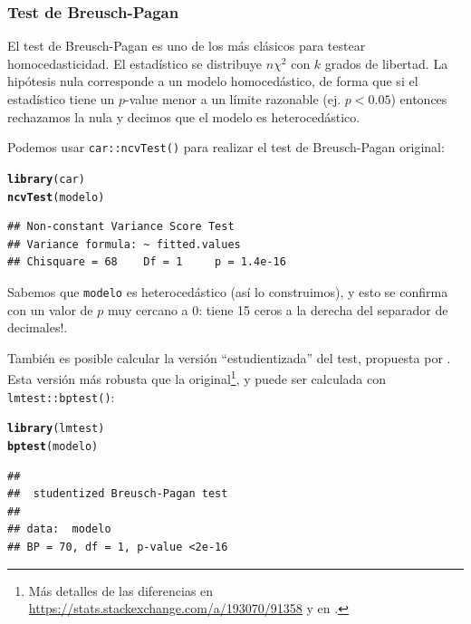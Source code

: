 \documentclass{article}\usepackage[]{graphicx}\usepackage[]{color}
\makeatletter
\newcommand{\hlstd}[1]{\textcolor[rgb]{0.345,0.345,0.345}{#1}}%
\newcommand{\hlkwd}[1]{\textcolor[rgb]{0.737,0.353,0.396}{\textbf{#1}}}%
\newenvironment{kframe}{%
 \def\at@end@of@kframe{}%
 \ifinner\ifhmode%
  \def\at@end@of@kframe{\end{minipage}}%
  \begin{minipage}{\columnwidth}%
 \fi\fi%
 \def\FrameCommand##1{\hskip\@totalleftmargin \hskip-\fboxsep
 \colorbox{shadecolor}{##1}\hskip-\fboxsep
     \hskip-\linewidth \hskip-\@totalleftmargin \hskip\columnwidth}%
 \MakeFramed {\advance\hsize-\width
   \@totalleftmargin\z@ \linewidth\hsize
   \@setminipage}}%
 {\par\unskip\endMakeFramed%
 \at@end@of@kframe}
\newenvironment{knitrout}{}{} %
\makeatother
\begin{document}
\subsubsection{Test de Breusch-Pagan}

El test de Breusch-Pagan es uno de los más clásicos para testear homocedasticidad. El estadístico se distribuye $n\chi^2$ con $k$ grados de libertad. La hipótesis nula corresponde a un modelo homocedástico, de forma que si el estadístico tiene un $p$-value menor a un límite razonable (ej. $p<0.05$) entonces rechazamos la nula y decimos que el modelo es heterocedástico.

Podemos usar \verb|car::ncvTest()| para realizar el test de Breusch-Pagan original:

\begin{knitrout}
\color{fgcolor}\begin{kframe}
\begin{alltt}
\hlkwd{library}\hlstd{(car)}
\hlkwd{ncvTest}\hlstd{(modelo)}
\end{alltt}
\begin{verbatim}
## Non-constant Variance Score Test 
## Variance formula: ~ fitted.values 
## Chisquare = 68    Df = 1     p = 1.4e-16
\end{verbatim}
\end{kframe}
\end{knitrout}

Sabemos que \verb|modelo| es heterocedástico (así lo construimos), y esto se confirma con un valor de $p$ muy cercano a 0: tiene 15 ceros a la derecha del separador de decimales!.

También es posible calcular la versión ``estudientizada'' del test, propuesta por \textcite{koenker_note_1981}. Esta versión más robusta que la original\footnote{Más detalles de las diferencias en \url{https://stats.stackexchange.com/a/193070/91358} y en \textcite{koenker_note_1981}.}, y puede ser calculada con \verb|lmtest::bptest()|:

\begin{knitrout}
\color{fgcolor}\begin{kframe}
\begin{alltt}
\hlkwd{library}\hlstd{(lmtest)}
\hlkwd{bptest}\hlstd{(modelo)}
\end{alltt}
\begin{verbatim}
## 
## 	studentized Breusch-Pagan test
## 
## data:  modelo
## BP = 70, df = 1, p-value <2e-16
\end{verbatim}
\end{kframe}
\end{knitrout}
\end{document}
